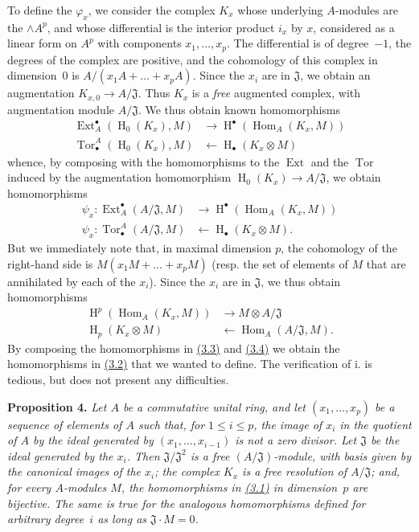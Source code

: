 \documentclass{article}
\newenvironment{itenv}[1]
  {\phantomsection\par\medskip\noindent\textbf{#1.}\itshape}
  {\medskip}
\newcommand{\from}{\leftarrow}
\renewcommand{\leq}{\leqslant}
\DeclareMathOperator{\Ext}{Ext}
\DeclareMathOperator{\Hom}{Hom}
\DeclareMathOperator{\Tor}{Tor}
\DeclareMathOperator{\HH}{H}
\newcommand{\oldpage}[1]{\marginpar{\footnotesize$\Big\vert$ \textit{p.~#1}}}
\begin{document}
To define the $\varphi_x$, we consider the complex $K_x$ whose underlying $A$-modules are the $\wedge A^p$, and whose differential is the interior product $i_x$ by $x$, considered as a linear form on $A^p$ with components $x_1,\ldots,x_p$.
The differential is of degree~$-1$, the degrees of the complex are positive, and the cohomology of this complex in dimension~$0$ is $A/(x_1A+\ldots+x_pA)$.
Since the $x_i$ are in $\mathfrak{J}$, we obtain an augmentation $K_{x,0}\to A/\mathfrak{J}$.
Thus $K_x$ is a \emph{free} augmented complex, with augmentation module $A/\mathfrak{J}$.
We thus obtain known homomorphisms
\[
  \begin{aligned}
    \Ext_A^\bullet(\HH_0(K_x),M) &\to \HH^\bullet(\Hom_A(K_x,M))
  \\\Tor_\bullet^A(\HH_0(K_x),M) &\from \HH_\bullet(K_x\otimes M)
  \end{aligned}
\]
whence, by composing with the homomorphisms to the $\Ext$ and the $\Tor$ induced by the augmentation homomorphism $\HH_0(K_x)\to A/\mathfrak{J}$, we obtain homomorphisms
\[
\label{3.3}
  \begin{aligned}
    \psi_x\colon \Ext_A^\bullet(A/\mathfrak{J},M) &\to \HH^\bullet(\Hom_A(K_x,M))
  \\\psi_x\colon \Tor_\bullet^A(A/\mathfrak{J},M) &\from \HH_\bullet(K_x\otimes M).
  \end{aligned}
\tag{3.3}
\]
But we immediately note that, in maximal dimension $p$, the cohomology of the right-hand side is $M(x_1M+\ldots+x_pM)$ (resp. the set of elements of $M$ that are annihilated by each of the $x_i$).
Since the $x_i$ are in $\mathfrak{J}$, we thus obtain homomorphisms
\[
\label{3.4}
  \begin{aligned}
    \HH^p(\Hom_A(K_x,M)) &\to M\otimes A/\mathfrak{J}
  \\\HH_p(K_x\otimes M) &\from \Hom_A(A/\mathfrak{J},M).
  \end{aligned}
\tag{3.4}
\]
By composing the homomorphisms in \hyperref[3.3]{(3.3)} and \hyperref[3.4]{(3.4)} we obtain the homomorphisms in \hyperref[3.2]{(3.2)} that we wanted to define.
The verification of i. is tedious, but does not present any difficulties.

\oldpage{149-07}
\begin{itenv}{Proposition 4}
\label{proposition4}
  Let $A$ be a commutative unital ring, and let $(x_1,\ldots,x_p)$  be a sequence of elements of $A$ such that, for $1\leq i\leq p$, the image of $x_i$ in the quotient of $A$ by the ideal generated by $(x_1,\ldots,x_{i-1})$ is not a zero divisor.
  Let $\mathfrak{J}$ be the ideal generated by the $x_i$.
  Then $\mathfrak{J}/\mathfrak{J}^2$ is a free $(A/\mathfrak{J})$-module, with basis given by the canonical images of the $x_i$;
  the complex $K_x$ is a free resolution of $A/\mathfrak{J}$;
  and, for every $A$-modules $M$, the homomorphisms in \hyperref[3.1]{(3.1)} in dimension~$p$ are bijective.
  The same is true for the analogous homomorphisms defined for arbitrary degree~$i$ as long as $\mathfrak{J}\cdot M=0$.
\end{itenv}
\end{document}
